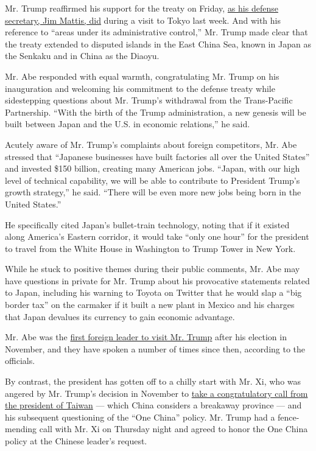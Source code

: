 Mr. Trump reaffirmed his support for the treaty on Friday,
\href{https://www.nytimes.com/2017/02/03/world/asia/us-japan-mattis-abe-defense.html}{as
his defense secretary, Jim Mattis, did} during a visit to Tokyo last
week. And with his reference to ``areas under its administrative
control,'' Mr. Trump made clear that the treaty extended to disputed
islands in the East China Sea, known in Japan as the Senkaku and in
China as the Diaoyu.

Mr. Abe responded with equal warmth, congratulating Mr. Trump on his
inauguration and welcoming his commitment to the defense treaty while
sidestepping questions about Mr. Trump's withdrawal from the
Trans-Pacific Partnership. ``With the birth of the Trump administration,
a new genesis will be built between Japan and the U.S. in economic
relations,'' he said.

Acutely aware of Mr. Trump's complaints about foreign competitors, Mr.
Abe stressed that ``Japanese businesses have built factories all over
the United States'' and invested \$150 billion, creating many American
jobs. ``Japan, with our high level of technical capability, we will be
able to contribute to President Trump's growth strategy,'' he said.
``There will be even more new jobs being born in the United States.''

He specifically cited Japan's bullet-train technology, noting that if it
existed along America's Eastern corridor, it would take ``only one
hour'' for the president to travel from the White House in Washington to
Trump Tower in New York.

While he stuck to positive themes during their public comments, Mr. Abe
may have questions in private for Mr. Trump about his provocative
statements related to Japan, including his warning to Toyota on Twitter
that he would slap a ``big border tax'' on the carmaker if it built a
new plant in Mexico and his charges that Japan devalues its currency to
gain economic advantage.

Mr. Abe was the
\href{https://www.nytimes.com/2016/11/17/world/asia/shinzo-abe-donald-trump.html}{first
foreign leader to visit Mr. Trump} after his election in November, and
they have spoken a number of times since then, according to the
officials.

By contrast, the president has gotten off to a chilly start with Mr. Xi,
who was angered by Mr. Trump's decision in November to
\href{https://www.nytimes.com/2016/12/05/world/asia/china-donald-trump-taiwan-twitter.html}{take
a congratulatory call from the president of Taiwan} --- which China
considers a breakaway province --- and his subsequent questioning of the
``One China'' policy. Mr. Trump had a fence-mending call with Mr. Xi on
Thursday night and agreed to honor the One China policy at the Chinese
leader's request.

